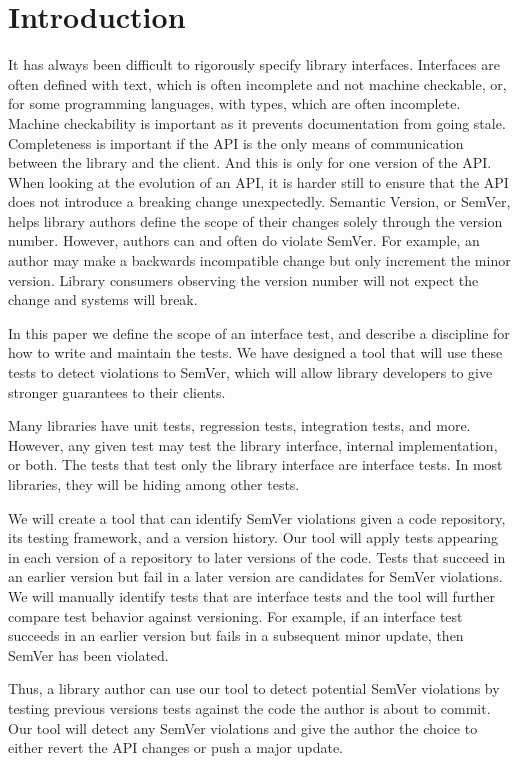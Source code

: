 \section{Introduction}

It has always been difficult to rigorously specify library interfaces.
Interfaces are often defined with text, which is often incomplete and not
machine checkable, or, for some programming languages, with types, which are
often incomplete. Machine checkability is important as it prevents
documentation from going stale. Completeness is important if the API is the
only means of communication between the library and the client. And this is
only for one version of the API. When looking at the evolution of an API, it is
harder still to ensure that the API does not introduce a breaking change
unexpectedly.  Semantic Version, or SemVer, helps library authors define the
scope of their changes solely through the version number.  However, authors can
and often do violate SemVer. For example, an author may make a backwards
incompatible change but only increment the minor version.  Library consumers
observing the version number will not expect the change and systems will break.

In this paper we define the scope of an interface test, and describe a
discipline for how to write and maintain the tests. We have designed a tool
that will use these tests to detect violations to SemVer, which will allow
library developers to give stronger guarantees to their clients. 

Many libraries have unit tests, regression tests, integration tests, and more.
However, any given test may test the library interface, internal
implementation, or both.  The tests that test only the library interface are
interface tests.  In most libraries, they will be hiding among other tests.

We will create a tool that can identify SemVer violations given a code
repository, its testing framework, and a version history.  Our tool will apply
tests appearing in each version of a repository to later versions of the code.
Tests that succeed in an earlier version but fail in a later version are
candidates for SemVer violations.  We will manually identify tests that are
interface tests and the tool will further compare test behavior against
versioning.  For example, if an interface test succeeds in an earlier version
but fails in a subsequent minor update, then SemVer has been violated.  

Thus, a library author can use our tool to detect potential SemVer violations
by testing previous versions tests against the code the author is about to
commit. Our tool will detect any SemVer violations and give the author the
choice to either revert the API changes or push a major update.
